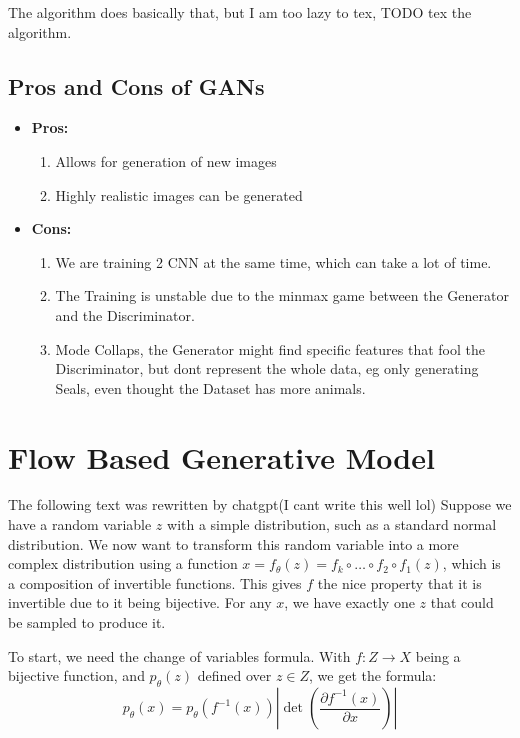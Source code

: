 \documentclass[a4paper]{article}
\begin{document}
The algorithm does basically that, but I am too lazy to tex, TODO tex the algorithm. 

\subsection{Pros and Cons of GANs}
\begin{itemize}
    \item \textbf{Pros:}
    \begin{enumerate}
        \item Allows for generation of new images
        \item Highly realistic images can be generated
    \end{enumerate}
    \item \textbf{Cons:}
    \begin{enumerate}
        \item We are training 2 CNN at the same time, which can take a lot of time.
        \item The Training is unstable due to the minmax game between the Generator and the Discriminator.
        \item Mode Collaps, the Generator might find specific features that fool the Discriminator, but dont represent the whole data, eg only generating Seals, even thought the Dataset has more animals. 
        \end{enumerate}
\end{itemize}
\section{Flow Based Generative Model}
The following text was rewritten by chatgpt(I cant write this well lol)
Suppose we have a random variable \( z \) with a simple distribution, such as a standard normal distribution. We now want to transform this random variable into a more complex distribution using a function \( x = f_{\theta}(z) = f_k \circ \ldots \circ f_2 \circ f_1(z) \), which is a composition of invertible functions. This gives \( f \) the nice property that it is invertible due to it being bijective. For any \( x \), we have exactly one \( z \) that could be sampled to produce it.

To start, we need the change of variables formula. With \( f : Z \rightarrow X \) being a bijective function, and \( p_{\theta}(z) \) defined over \( z \in Z \), we get the formula:
\[
p_{\theta}(x) = p_{\theta}(f^{-1}(x)) \left| \det \left( \frac{\partial f^{-1}(x)}{\partial x} \right) \right|
\]
\end{document}
